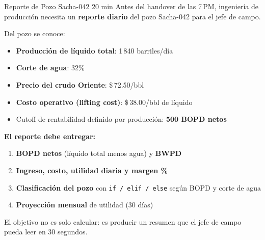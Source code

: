 \documentclass[aspectratio=169, 11pt]{beamer}
\begin{document}
\begin{frame}[fragile,shrink=10]{Reporte de Pozo Sacha-042 \hfill {\normalsize\color{arcaRed}\faClock\hspace{4pt}20 min}}
  \vspace{-6pt}
  {\small\color{arcaDark}
    Antes del handover de las 7\,PM, ingeniería de producción necesita
    un \textbf{reporte diario} del pozo Sacha-042 para el jefe de campo.}

  \vspace{4pt}
  {\small\color{arcaDark}
    Del pozo se conoce:}

  \vspace{2pt}
  {\footnotesize
  \begin{itemize}\setlength{\itemsep}{1pt}
    \item[{\color{arcaRed}\scriptsize\faTint}]
      \textbf{Producción de líquido total}: 1\,840 barriles/día
    \item[{\color{arcaRed}\scriptsize\faPercent}]
      \textbf{Corte de agua}: 32\%
    \item[{\color{arcaRed}\scriptsize\faDollarSign}]
      \textbf{Precio del crudo Oriente}: \$\,72.50/bbl
    \item[{\color{arcaRed}\scriptsize\faCogs}]
      \textbf{Costo operativo (lifting cost)}: \$\,38.00/bbl de líquido
    \item[{\color{arcaRed}\scriptsize\faExclamationCircle}]
      Cutoff de rentabilidad definido por producción:
      \textbf{500 BOPD netos}
  \end{itemize}
  }

  \vspace{4pt}
  {\small\color{arcaDark}\bfseries
    El reporte debe entregar:}

  \vspace{2pt}
  {\footnotesize
  \begin{enumerate}\setlength{\itemsep}{1pt}
    \item[{\color{arcaRed}\bfseries 1.}]
      \textbf{BOPD netos} (líquido total menos agua) y \textbf{BWPD}
    \item[{\color{arcaRed}\bfseries 2.}]
      \textbf{Ingreso, costo, utilidad diaria y margen \%}
    \item[{\color{arcaRed}\bfseries 3.}]
      \textbf{Clasificación del pozo} con \texttt{if / elif / else} según BOPD y corte de agua
    \item[{\color{arcaRed}\bfseries 4.}]
      \textbf{Proyección mensual} de utilidad (30 días)
  \end{enumerate}
  }

  \vspace{3pt}
  {\scriptsize\color{textMuted}
    \faLightbulb[regular]\hspace{4pt}%
    El objetivo no es solo calcular:
    es producir un resumen que el jefe de campo pueda leer en 30 segundos.}
\end{frame}
\end{document}
